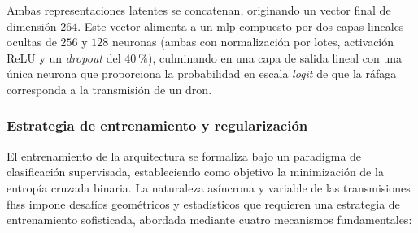
Ambas representaciones latentes se concatenan, originando un vector final de dimensión $264$. Este vector alimenta a un \gls{mlp} compuesto por dos capas lineales ocultas de $256$ y $128$ neuronas (ambas con normalización por lotes, activación ReLU y un \textit{dropout} del $40~\%$), culminando en una capa de salida lineal con una única neurona que proporciona la probabilidad en escala \textit{logit} de que la ráfaga corresponda a la transmisión de un dron.





\subsubsection{Estrategia de entrenamiento y regularización}
El entrenamiento de la arquitectura se formaliza bajo un paradigma de clasificación supervisada, estableciendo como objetivo la minimización de la entropía cruzada binaria. La naturaleza asíncrona y variable de las transmisiones \gls{fhss} impone desafíos geométricos y estadísticos que requieren una estrategia de entrenamiento sofisticada, abordada mediante cuatro mecanismos fundamentales:
